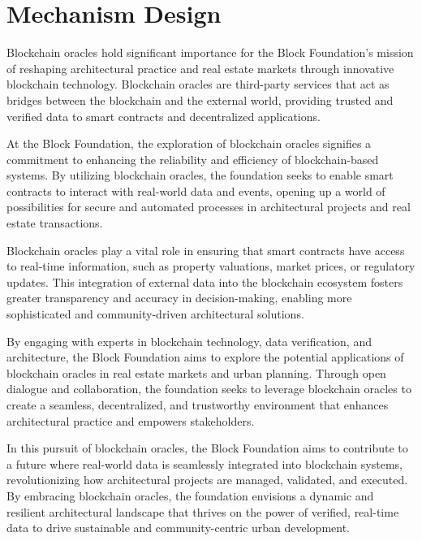 \newpage
\section{Mechanism Design}


Blockchain oracles hold significant importance for the Block Foundation's mission of reshaping architectural practice and real estate markets through innovative blockchain technology. Blockchain oracles are third-party services that act as bridges between the blockchain and the external world, providing trusted and verified data to smart contracts and decentralized applications.

At the Block Foundation, the exploration of blockchain oracles signifies a commitment to enhancing the reliability and efficiency of blockchain-based systems. By utilizing blockchain oracles, the foundation seeks to enable smart contracts to interact with real-world data and events, opening up a world of possibilities for secure and automated processes in architectural projects and real estate transactions.

Blockchain oracles play a vital role in ensuring that smart contracts have access to real-time information, such as property valuations, market prices, or regulatory updates. This integration of external data into the blockchain ecosystem fosters greater transparency and accuracy in decision-making, enabling more sophisticated and community-driven architectural solutions.

By engaging with experts in blockchain technology, data verification, and architecture, the Block Foundation aims to explore the potential applications of blockchain oracles in real estate markets and urban planning. Through open dialogue and collaboration, the foundation seeks to leverage blockchain oracles to create a seamless, decentralized, and trustworthy environment that enhances architectural practice and empowers stakeholders.

In this pursuit of blockchain oracles, the Block Foundation aims to contribute to a future where real-world data is seamlessly integrated into blockchain systems, revolutionizing how architectural projects are managed, validated, and executed. By embracing blockchain oracles, the foundation envisions a dynamic and resilient architectural landscape that thrives on the power of verified, real-time data to drive sustainable and community-centric urban development.